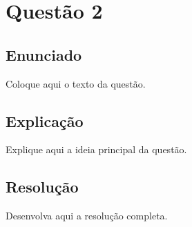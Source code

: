 \section{Questão 2}

\subsection{Enunciado}

Coloque aqui o texto da questão.

\vspace{0.5cm}

\subsection{Explicação}

Explique aqui a ideia principal da questão.

\vspace{0.5cm}

\subsection{Resolução}

Desenvolva aqui a resolução completa.